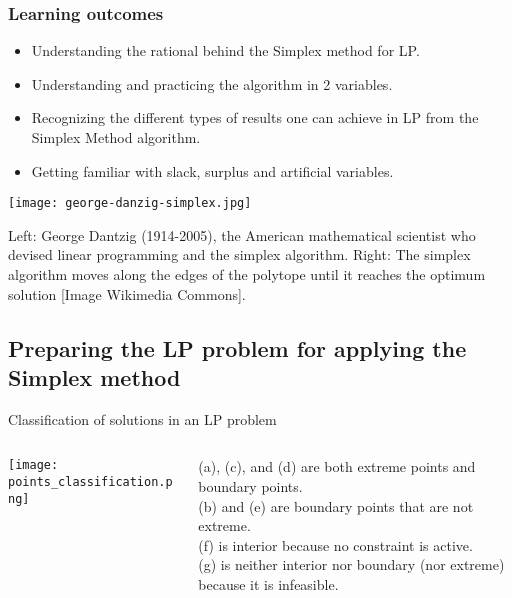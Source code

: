 \documentclass[c]{beamer}
\begin{document}
\begin{frame}
\frametitle{Learning outcomes}
\begin{itemize}
  \item Understanding the rational behind the Simplex method for LP.
  \item Understanding and practicing the algorithm in 2 variables.
  \item Recognizing the different types of results one can achieve in LP from the Simplex Method algorithm.
  \item Getting familiar with slack, surplus and artificial variables.
\end{itemize}
\end{frame}


\begin{frame}
  \begin{center}
    \texttt{[image: george-danzig-simplex.jpg]}
  \end{center}

  Left: George Dantzig (1914-2005), the American mathematical scientist who devised linear programming and the simplex algorithm. Right: The simplex algorithm moves along the edges of the polytope until it reaches the optimum solution [Image Wikimedia Commons].
\end{frame}

\subsection{Preparing the LP problem for applying the Simplex method}

\begin{frame}{Classification of solutions in an LP problem}
  \begin{columns}[T]
    \begin{column}{.45\textwidth}
      \begin{center}
        \texttt{[image: points\_classification.png]}
      \end{center}
    \end{column}
    \begin{column}{.45\textwidth}
      (a), (c), and (d) are both extreme points and boundary points. \\
      (b) and (e) are boundary points that are not extreme. \\
      (f) is interior because no constraint is active. \\
      (g) is neither interior nor boundary (nor extreme) because it is infeasible.\cite{rardin}
    \end{column}
  \end{columns}
\end{frame}
\end{document}
